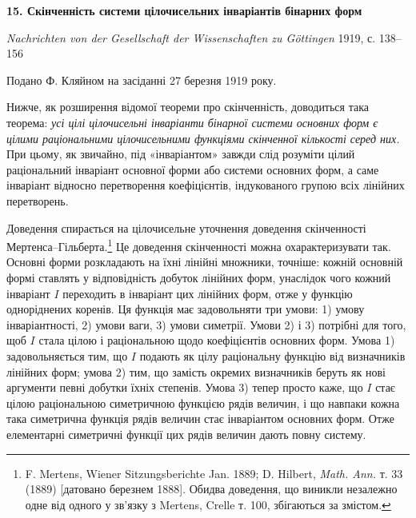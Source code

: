 \documentclass[11pt]{article}
\begin{document}

\begin{center}
{\Large\bfseries 15. Скінченність системи цілочисельних інваріантів бінарних форм\par}
\vspace{1em}
\emph{Nachrichten von der Gesellschaft der Wissenschaften zu Göttingen} 1919, с. 138--156
\end{center}

\vspace{2em}
\begin{center}
Подано Ф. Кляйном на засіданні 27 березня 1919 року.
\end{center}

Нижче, як розширення відомої теореми про скінченність, доводиться така теорема:
\emph{усі цілі цілочисельні інваріанти бінарної системи основних форм є цілими раціональними цілочисельними функціями скінченної кількості серед них.}
При цьому, як звичайно, під «інваріантом» завжди слід розуміти цілий раціональний інваріант основної форми або системи основних форм, а саме інваріант відносно перетворення коефіцієнтів, індукованого групою всіх лінійних перетворень.

Доведення спирається на цілочисельне уточнення доведення скінченності Мертенса--Гільберта.\footnote{F. Mertens, Wiener Sitzungsberichte Jan. 1889; D. Hilbert, \emph{Math. Ann.} т. 33 (1889) [датовано березнем 1888]. Обидва доведення, що виникли незалежно одне від одного у зв'язку з Mertens, Crelle т. 100, збігаються за змістом.}
Це доведення скінченності можна охарактеризувати так. Основні форми розкладають на їхні лінійні множники, точніше: кожній основній формі ставлять у відповідність добуток лінійних форм, унаслідок чого кожний інваріант \(I\) переходить в інваріант цих лінійних форм, отже у функцію одноріднених коренів. Ця функція має задовольняти три умови: 1) умову інваріантності, 2) умови ваги, 3) умови симетрії. Умови 2) і 3) потрібні для того, щоб \(I\) стала цілою і раціональною щодо коефіцієнтів основних форм. Умова 1) задовольняється тим, що \(I\) подають як цілу раціональну функцію від визначників лінійних форм; умова 2) тим, що замість окремих визначників беруть як нові аргументи певні добутки їхніх степенів. Умова 3) тепер просто каже, що \(I\) стає цілою раціональною симетричною функцією рядів величин, і що навпаки кожна така симетрична функція рядів величин стає інваріантом основних форм. Отже елементарні симетричні функції цих рядів величин дають повну систему.
\end{document}
